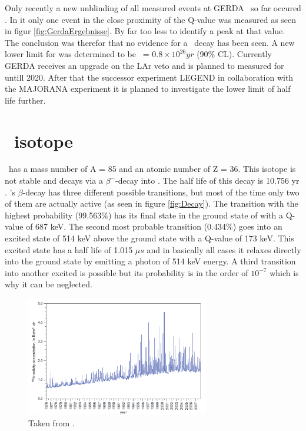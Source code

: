 \documentclass[encoding=utf8,british]{tumphthesis}
\begin{document}
Only recently a new unblinding of all measured events at GERDA \PII\ so far  occured \cite{zsigmond_new_2018}.
In it only one event in the close proximity of the Q-value was measured as seen in figur \ref{fig:GerdaErgebnisse}.
By far too less to identify a peak at that value.
The conclusion was therefor that no evidence for a \onbb\ decay has been seen.
A new lower limit for  was determined to be \thalfzero\ = $0.8\times10^{26}\unit{yr}$ (90$\%$ CL).
Currently GERDA receives an upgrade on the LAr veto and is planned to measured for untill 2020.
After that the successor experiment LEGEND in collaboration with the MAJORANA experiment it is planned to investigate the lower limit of  half life further.




\section{\Kr\ isotope}
\label{sec:Kry85}

\Kr\ has a mass number of A = 85 and an atomic number of Z = 36.
This isotope is not stable and decays via a $\beta^-$-decay into .
The half life of this decay is 10.756 yr \cite{singh_nuclear_2014}.
\Kr's $\beta$-decay has three different possible transitions, but most of the time only two of them are actually active (as seen in figure \ref{fig:Decay}).
The transition with the highest probability (99.563$\%$) has its final state in the ground state of  with a Q-value of 687 keV.
The second most probable transition (0.434$\%$) goes into an excited state of 514 keV above the ground state with a Q-value of 173 keV.
This excited state has a half life of 1.015 $\unit{\mu s}$ and in basically all cases it relaxes directly into the ground state by emitting a photon of 514 keV energy. 
A third transition into another excited  is possible but its probability is in the order of $10^{-7}$ which is why it can be neglected. 
\\

\begin{figure}[t!]
	\centering
	\ifmakefigures%
	\includegraphics[width=80mm]{./Bilder/Kr85Aenderung.png}
	\fi%
	\caption{
		Taken from \cite{bieringer_trace_2009}.
	}
    \label{fig:Kr85Aenderung}
	\end{figure}
\end{document}
